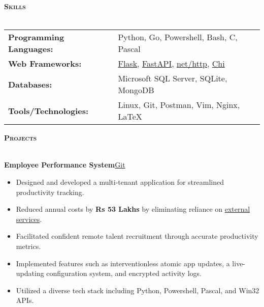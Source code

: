 \documentclass[a4paper]{article}
\newcommand{\lineunder} {
\vspace*{-8pt} \\
\hspace*{-18pt} \hrulefill \\
}
\newcommand{\header}[1]{%
{\hspace*{-18pt}\vspace*{6pt} \textsc{\textbf{\Large{#1}}}}%
\vspace*{-6pt} \lineunder
}
\begin{document}

\header{Skills}
\vspace{1mm}

\begin{tabular}{V{5cm} @{\hskip 0.6cm} V{12cm}}
\textbf{Programming Languages:} & Python, Go, Powershell, Bash, C, Pascal \\

\textbf{Web Frameworks:} & 
    \href{https://github.com/pallets/flask}{Flask},
    \href{https://github.com/tiangolo/fastapi}{FastAPI},
    \href{https://pkg.go.dev/net/http}{net/http},
    \href{https://github.com/go-chi/chi}{Chi} \\

\textbf{Databases:} & Microsoft SQL Server, SQLite, MongoDB \\

\textbf{Tools/Technologies:} & Linux, Git, Postman, Vim, Nginx, \LaTeX{} \\

\end{tabular}

\vspace{4mm}


\header{Projects}
\vspace{1mm}

{\textbf{Employee Performance System}}\hfill \href{https://github.com/swarnimcodes/employee-performance}{Git}\\
\begin{itemize} 
    \item Designed and developed a multi-tenant
    application for streamlined productivity
    tracking. \\
    \item Reduced annual costs by \textbf{Rs 53 Lakhs} by eliminating 
    reliance on \href{https://desktime.com/}{external services}. \\
    \item Facilitated confident remote talent recruitment through accurate productivity metrics.\\ 
    \item Implemented features such as interventionless atomic app updates,
    a live-updating configuration system, and encrypted activity logs. \\
    \item Utilized a diverse tech stack including Python, Powershell, Pascal, and Win32 APIs. \\
\end{itemize}
\vspace*{2mm}
\end{document}
